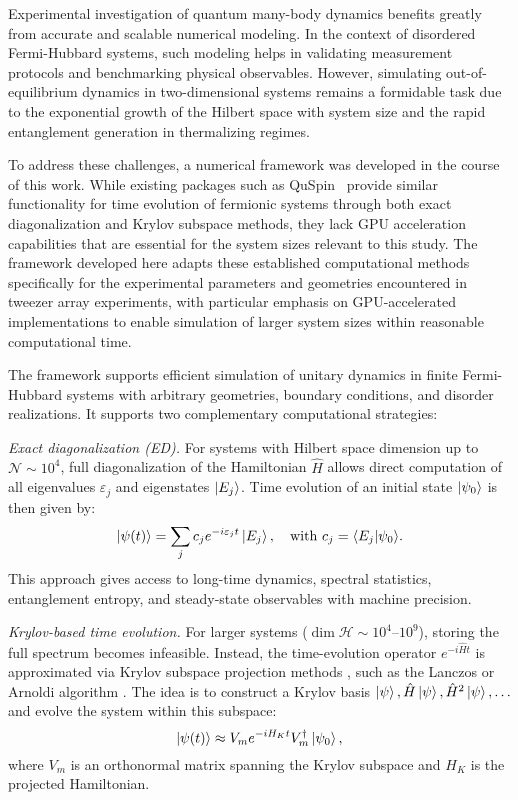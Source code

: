 
Experimental investigation of quantum many-body dynamics benefits greatly from accurate and scalable numerical modeling. In the context of disordered Fermi-Hubbard systems, such modeling helps in validating measurement protocols and benchmarking physical observables. However, simulating out-of-equilibrium dynamics in two-dimensional systems remains a formidable task due to the exponential growth of the Hilbert space with system size and the rapid entanglement generation in thermalizing regimes.

To address these challenges, a numerical framework was developed in the course of this work. While existing packages such as QuSpin~\cite{weinberg_quspin_2019} provide similar functionality for time evolution of fermionic systems through both exact diagonalization and Krylov subspace methods, they lack GPU acceleration capabilities that are essential for the system sizes relevant to this study. The framework developed here adapts these established computational methods specifically for the experimental parameters and geometries encountered in tweezer array experiments, with particular emphasis on GPU-accelerated implementations to enable simulation of larger system sizes within reasonable computational time.

The framework supports efficient simulation of unitary dynamics in finite Fermi-Hubbard systems with arbitrary geometries, boundary conditions, and disorder realizations. It supports two complementary computational strategies:

\textit{Exact diagonalization (ED).}
For systems with Hilbert space dimension up to $\mathcal{N} \sim 10^4$, full diagonalization of the Hamiltonian $\hat{H}$ allows direct computation of all eigenvalues ${\varepsilon_j}$ and eigenstates ${\left| E_j \right\rangle}$. Time evolution of an initial state $\left| \psi_0 \right\rangle$ is then given by:
\begin{equation}
\ket{\psi(t)} = \sum_j c_j e^{-i \varepsilon_j t} \ket{E_j}, \quad \text{with } c_j = \bk{E_j}{\psi_0}.
\end{equation}
This approach gives access to long-time dynamics, spectral statistics, entanglement entropy, and steady-state observables with machine precision. 

\textit{Krylov-based time evolution.}
For larger systems ($\dim \mathcal{H} \sim 10^4$–$10^9$), storing the full spectrum becomes infeasible. Instead, the time-evolution operator $e^{-i \hat{H} t}$ is approximated via Krylov subspace projection methods \cite{weinberg_quspin_2019}, such as the Lanczos or Arnoldi algorithm \cite{saad_analysis_1992,hochbruck_krylov_1997}. The idea is to construct a Krylov basis ${ \left| \psi \right\rangle, \hat{H} \left| \psi \right\rangle, \hat{H}^2 \left| \psi \right\rangle, \ldots }$ and evolve the system within this subspace:
\begin{equation}
\left| \psi(t) \right\rangle \approx V_m e^{-i H_K t} V_m^\dagger \left| \psi_0 \right\rangle,
\end{equation}
where $V_m$ is an orthonormal matrix spanning the Krylov subspace and $H_K$ is the projected Hamiltonian. 


